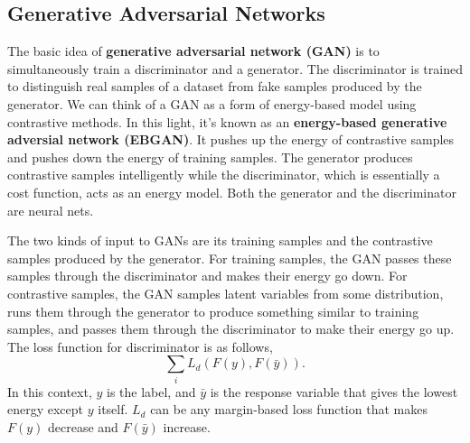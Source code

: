 \documentclass{article}
\begin{document}



\subsection{Generative Adversarial Networks}


The basic idea of \textbf{generative adversarial network (GAN)} is to simultaneously train a discriminator and a generator. The discriminator is trained to distinguish real samples of a dataset from fake samples produced by the generator. We can think of a GAN as a form of energy-based model using contrastive methods. In this light, it's known as an \textbf{energy-based generative adversial network (EBGAN)}. It pushes up the energy of contrastive samples and pushes down the energy of training samples. The generator produces contrastive samples intelligently while the discriminator, which is essentially a cost function, acts as an energy model. Both the generator and the discriminator are neural nets. 

The two kinds of input to GANs are its training samples and the contrastive samples produced by the generator. For training samples, the GAN passes these samples through the discriminator and makes their energy go down. For contrastive samples, the GAN samples latent variables from some distribution, runs them through the generator to produce something similar to training samples, and passes them through the discriminator to make their energy go up. The loss function for discriminator is as follows,
\[
    \sum_i  L_d(F(y), F(\bar y)).
\]
In this context, $y$ is the label, and $\bar{y}$ is the response variable that gives the lowest energy except $y$ itself. $L_d$ can be any margin-based loss function that makes $F(y)$ decrease and $F(\bar{y})$ increase.
\end{document}
